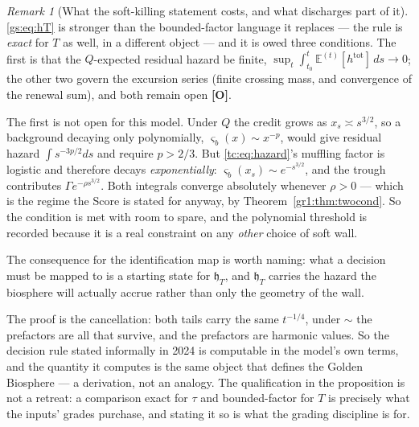 \documentclass[11pt]{article}
\numberwithin{equation}{section}
\theoremstyle{plain}
\theoremstyle{definition}
\theoremstyle{remark}
\newtheorem{remark}[theorem]{Remark}
\newcommand{\E}{\mathbb{E}}
\newcommand{\hm}{\mathfrak{h}}
\begin{document}
\begin{remark}[What the soft-killing statement costs, and what discharges part of it]
\label{gs:rem:hT}
\eqref{gs:eq:hT} is stronger than the bounded-factor language it replaces --- the rule is
\emph{exact} for $T$ as well, in a different object --- and it is owed three conditions. The
first is that the $Q$-expected residual hazard be finite,
$\sup_t\int_{t_0}^t\E^{(t)}[h^{\mathrm{tot}}]\,ds\to0$; the other two govern the excursion
series (finite crossing mass, and convergence of the renewal sum), and both remain open
\textbf{[O]}.

The first is not open for this model. Under $Q$ the credit grows as $x_s\asymp s^{3/2}$, so a
background decaying only polynomially, $\varsigma_b(x)\sim x^{-p}$, would give residual hazard
$\int s^{-3p/2}ds$ and require $p>2/3$. But \eqref{tc:eq:hazard}'s muffling factor is logistic
and therefore decays \emph{exponentially}: $\varsigma_b(x_s)\sim e^{-s^{3/2}}$, and the trough
contributes $\Gamma e^{-\rho s^{3/2}}$. Both integrals converge absolutely whenever $\rho>0$ ---
which is the regime the Score is stated for anyway, by
Theorem~\ref{gr1:thm:twocond}. So the condition is met with room to spare, and the polynomial
threshold is recorded because it is a real constraint on any \emph{other} choice of soft wall.

The consequence for the identification map is worth naming: what a decision must be mapped to
is a starting state for $\hm_T$, and $\hm_T$ carries the hazard the biosphere will actually
accrue rather than only the geometry of the wall.
\end{remark}

The proof is the cancellation: both tails carry the same $t^{-1/4}$, under $\sim$ the prefactors are all that survive, and the prefactors are harmonic values. So the decision rule stated informally in 2024 is computable in the model's own terms, and the quantity it computes is the same object that defines the Golden Biosphere --- a derivation, not an analogy. The qualification in the proposition is not a retreat: a comparison exact for $\tau$ and bounded-factor for $T$ is precisely what the inputs' grades purchase, and stating it so is what the grading discipline is for.
\end{document}
